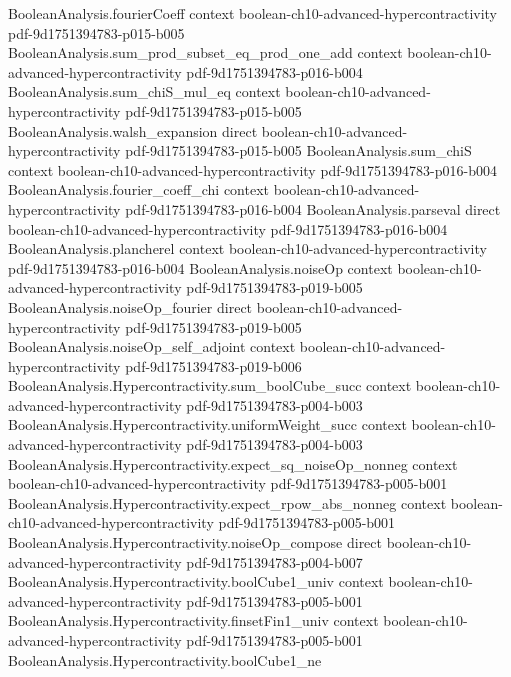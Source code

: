 \begin{theorem}
\proofstep
  {BooleanAnalysis.fourierCoeff}
  {context}
  {boolean-ch10-advanced-hypercontractivity}
  {pdf-9d1751394783-p015-b005}
\proofstep
  {BooleanAnalysis.sum_prod_subset_eq_prod_one_add}
  {context}
  {boolean-ch10-advanced-hypercontractivity}
  {pdf-9d1751394783-p016-b004}
\proofstep
  {BooleanAnalysis.sum_chiS_mul_eq}
  {context}
  {boolean-ch10-advanced-hypercontractivity}
  {pdf-9d1751394783-p015-b005}
\proofstep
  {BooleanAnalysis.walsh_expansion}
  {direct}
  {boolean-ch10-advanced-hypercontractivity}
  {pdf-9d1751394783-p015-b005}
\proofstep
  {BooleanAnalysis.sum_chiS}
  {context}
  {boolean-ch10-advanced-hypercontractivity}
  {pdf-9d1751394783-p016-b004}
\proofstep
  {BooleanAnalysis.fourier_coeff_chi}
  {context}
  {boolean-ch10-advanced-hypercontractivity}
  {pdf-9d1751394783-p016-b004}
\proofstep
  {BooleanAnalysis.parseval}
  {direct}
  {boolean-ch10-advanced-hypercontractivity}
  {pdf-9d1751394783-p016-b004}
\proofstep
  {BooleanAnalysis.plancherel}
  {context}
  {boolean-ch10-advanced-hypercontractivity}
  {pdf-9d1751394783-p016-b004}
\proofstep
  {BooleanAnalysis.noiseOp}
  {context}
  {boolean-ch10-advanced-hypercontractivity}
  {pdf-9d1751394783-p019-b005}
\proofstep
  {BooleanAnalysis.noiseOp_fourier}
  {direct}
  {boolean-ch10-advanced-hypercontractivity}
  {pdf-9d1751394783-p019-b005}
\proofstep
  {BooleanAnalysis.noiseOp_self_adjoint}
  {context}
  {boolean-ch10-advanced-hypercontractivity}
  {pdf-9d1751394783-p019-b006}
\proofstep
  {BooleanAnalysis.Hypercontractivity.sum_boolCube_succ}
  {context}
  {boolean-ch10-advanced-hypercontractivity}
  {pdf-9d1751394783-p004-b003}
\proofstep
  {BooleanAnalysis.Hypercontractivity.uniformWeight_succ}
  {context}
  {boolean-ch10-advanced-hypercontractivity}
  {pdf-9d1751394783-p004-b003}
\proofstep
  {BooleanAnalysis.Hypercontractivity.expect_sq_noiseOp_nonneg}
  {context}
  {boolean-ch10-advanced-hypercontractivity}
  {pdf-9d1751394783-p005-b001}
\proofstep
  {BooleanAnalysis.Hypercontractivity.expect_rpow_abs_nonneg}
  {context}
  {boolean-ch10-advanced-hypercontractivity}
  {pdf-9d1751394783-p005-b001}
\proofstep
  {BooleanAnalysis.Hypercontractivity.noiseOp_compose}
  {direct}
  {boolean-ch10-advanced-hypercontractivity}
  {pdf-9d1751394783-p004-b007}
\proofstep
  {BooleanAnalysis.Hypercontractivity.boolCube1_univ}
  {context}
  {boolean-ch10-advanced-hypercontractivity}
  {pdf-9d1751394783-p005-b001}
\proofstep
  {BooleanAnalysis.Hypercontractivity.finsetFin1_univ}
  {context}
  {boolean-ch10-advanced-hypercontractivity}
  {pdf-9d1751394783-p005-b001}
\proofstep
  {BooleanAnalysis.Hypercontractivity.boolCube1_ne}

\end{theorem}
